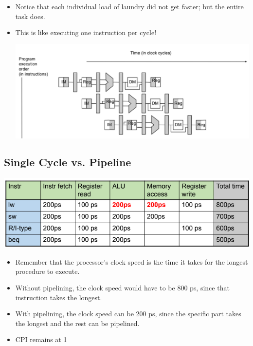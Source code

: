 \documentclass[10pt]{article}
\begin{document}
\begin{itemize}
\begin{center}
    \end{center}
    \item Notice that each individual load of laundry did not get faster; but the entire task does.
    \item This is like executing one instruction per cycle!
    \begin{center}
        \includegraphics*[scale=0.5]{W3_3.png}
    \end{center}
\end{itemize}

\subsection*{Single Cycle vs. Pipeline}
\begin{center}
    \includegraphics*{W3_4.png}
\end{center}
\begin{itemize}
    \item Remember that the processor's clock speed is the time it takes for the longest procedure to execute.
    \item Without pipelining, the clock speed would have to be 800 ps, since that instruction takes the longest.
    \item With pipelining, the clock speed can be 200 ps, since the specific part takes the longest and the rest can be pipelined.
    \item CPI remains at 1
\end{itemize}
\end{document}
